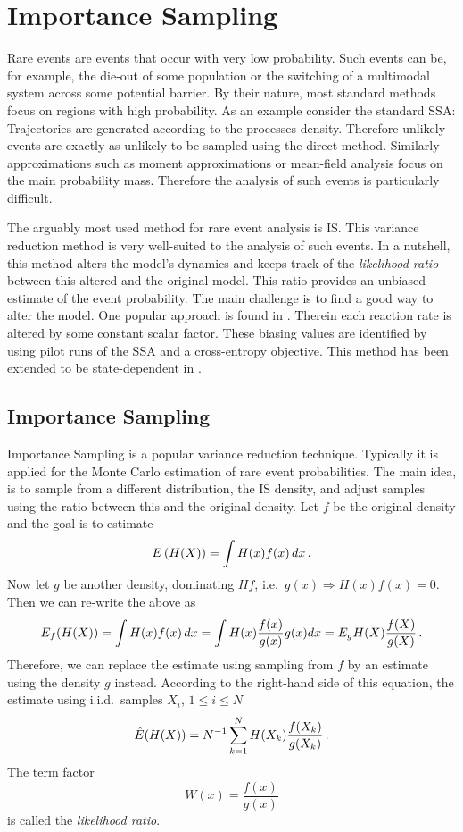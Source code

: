 \chapter{Importance Sampling}
Rare events are events that occur with very low probability.
Such events can be, for example, the die-out of some population or the switching of a multimodal system across some potential barrier.
By their nature, most standard methods focus on regions with high probability.
As an example consider the standard \ac{SSA}:
Trajectories are generated according to the processes density.
Therefore unlikely events are exactly as unlikely to be sampled using the direct method.
Similarly approximations such as moment approximations or mean-field analysis focus on the main probability mass.
Therefore the analysis of such events is particularly difficult.

The arguably most used method for rare event analysis is \acf{IS}.
This variance reduction method is very well-suited to the analysis of such events.
In a nutshell, this method alters the model's dynamics and keeps track of the \emph{likelihood ratio} between this altered and the original model.
This ratio provides an unbiased estimate of the event probability.
The main challenge is to find a good way to alter the model.
One popular approach is found in  \parencite{kuwahara2008efficient,daigle2011automated}.
Therein each reaction rate is altered by some constant scalar factor.
These biasing values are identified by using pilot runs of the \ac{SSA} and a cross-entropy objective.
This method has been extended to be state-dependent in \citet{roh2011state}.

\section{Importance Sampling}
Importance Sampling is  a popular variance reduction technique.
Typically it is applied for the Monte Carlo estimation of rare event probabilities.
The main idea, is to sample from a different distribution, the \ac{IS} density, and adjust samples using the ratio between this and the original density.
Let $f$ be the original density and the goal is to estimate
\[
    {E}\left(H(X)\right) = \int H(x)f(x)\,dx\,.
\]
Now let $g$ be another density, dominating $Hf$, i.e.\ $g(x)\Rightarrow H(x)f(x) = 0$. Then we can re-write the above as
\[
    {E}_f({H(X)}) = \int H(x)f(x)\,dx = \int H(x) \frac{f(x)}{g(x)} g(x) dx = {E}_g H(X) \frac{f(X)}{g(X)}\,.
\]
Therefore, we can replace the estimate using sampling from $f$ by an estimate using the density $g$ instead.
According to the right-hand side of this equation, the estimate using i.i.d.\ samples $X_i$, $1\leq i \leq N$
\begin{equation}\label{eq:imp_sampl}
    \hat{{E}}(H(X)) = N^{-1} \sum_{k=1}^N H(X_k) \frac{f(X_k)}{g(X_k)}\,.
\end{equation}
The term factor
\[
    W(x) = \frac{f(x)}{g(x)}
\]
is called the \emph{likelihood ratio}.

